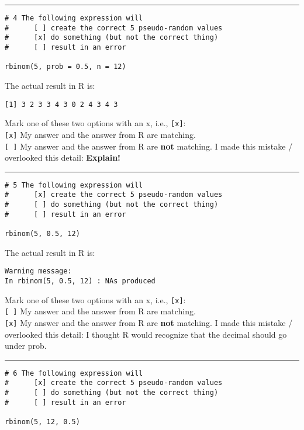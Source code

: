 \documentclass[12pt,letterpaper,final]{article}\usepackage[]{graphicx}\usepackage[]{xcolor}
\begin{document}
\begin{enumerate}
\hrule


\begin{verbatim}
# 4 The following expression will
#      [ ] create the correct 5 pseudo-random values
#      [x] do something (but not the correct thing)
#      [ ] result in an error

rbinom(5, prob = 0.5, n = 12)
\end{verbatim}

The actual result in R is: 
\begin{verbatim}
[1] 3 2 3 3 4 3 0 2 4 3 4 3
\end{verbatim}

Mark one of these two options with an x, i.e., \verb|[x]|: \\
\verb|[x]| My answer and the answer from R are matching. \\
\verb|[ ]| My answer and the answer from R are {\bf not} matching. 
I made this mistake / overlooked this detail: {\bf Explain!} \\


\hrule


\begin{verbatim}
# 5 The following expression will
#      [x] create the correct 5 pseudo-random values
#      [ ] do something (but not the correct thing)
#      [ ] result in an error

rbinom(5, 0.5, 12)
\end{verbatim}

The actual result in R is: 
\begin{verbatim}
Warning message:
In rbinom(5, 0.5, 12) : NAs produced
\end{verbatim}

Mark one of these two options with an x, i.e., \verb|[x]|: \\
\verb|[ ]| My answer and the answer from R are matching. \\
\verb|[x]| My answer and the answer from R are {\bf not} matching. 
I made this mistake / overlooked this detail: I thought R would recognize that the decimal should go under prob. \\


\hrule


\begin{verbatim}
# 6 The following expression will
#      [x] create the correct 5 pseudo-random values
#      [ ] do something (but not the correct thing)
#      [ ] result in an error

rbinom(5, 12, 0.5)
\end{verbatim}


\end{enumerate}
\end{document}
